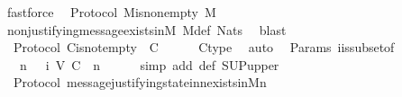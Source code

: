 \begin{isabellebody}
\ fastforce%
\endisatagproof
{\isafoldproof}%
%
\isadelimproof
\isanewline
%
\endisadelimproof
\isanewline
{}\isamarkupfalse%
\ {\isacharparenleft}\ Protocol{\isacharparenright}\ M{\isacharunderscore}is{\isacharunderscore}non{\isacharunderscore}empty{\isacharcolon}\ {\isachardoublequoteopen}M\ {\isasymnoteq}\ {\isasymemptyset}{\isachardoublequoteclose}\isanewline
%
\isadelimproof
\ \ %
\endisadelimproof
%
\isatagproof
{}\isamarkupfalse%
\ non{\isacharunderscore}justifying{\isacharunderscore}message{\isacharunderscore}exists{\isacharunderscore}in{\isacharunderscore}M{\isacharunderscore}{}\ M{\isacharunderscore}def\ Nats{\isacharunderscore}{}\ \isamarkupfalse%
\ blast%
\endisatagproof
{\isafoldproof}%
%
\isadelimproof
\isanewline
%
\endisadelimproof
\isanewline
{}\isamarkupfalse%
\ {\isacharparenleft}\ Protocol{\isacharparenright}\ C{\isacharunderscore}is{\isacharunderscore}not{\isacharunderscore}empty\ {\isacharcolon}\ {\isachardoublequoteopen}C\ {\isasymnoteq}\ {\isasymemptyset}{\isachardoublequoteclose}\isanewline
%
\isadelimproof
\ \ %
\endisadelimproof
%
\isatagproof
{}\isamarkupfalse%
\ C{\isacharunderscore}type\ \isamarkupfalse%
\ auto%
\endisatagproof
{\isafoldproof}%
%
\isadelimproof
\isanewline
%
\endisadelimproof
\isanewline
{}\isamarkupfalse%
\ {\isacharparenleft}\ Params{\isacharparenright}\ {\isasymSigma}i{\isacharunderscore}is{\isacharunderscore}subset{\isacharunderscore}of{\isacharunderscore}{\isasymSigma}\ {\isacharcolon}\isanewline
\ \ {\isachardoublequoteopen}{\isasymforall}\ n\ {\isasymin}\ {\isasymnat}{\isachardot}\ {\isasymSigma}{\isacharunderscore}i\ {\isacharparenleft}V{\isacharcomma}\ C{\isacharcomma}\ {\isasymepsilon}{\isacharparenright}\ n\ {\isasymsubseteq}\ {\isasymSigma}{\isachardoublequoteclose}\isanewline
%
\isadelimproof
\ \ %
\endisadelimproof
%
\isatagproof
{}\isamarkupfalse%
\ {\isacharparenleft}simp\ add{\isacharcolon}\ {\isasymSigma}{\isacharunderscore}def\ SUP{\isacharunderscore}upper{\isacharparenright}%
\endisatagproof
{\isafoldproof}%
%
\isadelimproof
\isanewline
%
\endisadelimproof
\isanewline
{}\isamarkupfalse%
\ {\isacharparenleft}\ Protocol{\isacharparenright}\ message{\isacharunderscore}justifying{\isacharunderscore}state{\isacharunderscore}in{\isacharunderscore}{\isasymSigma}{\isacharunderscore}n{\isacharunderscore}exists{\isacharunderscore}in{\isacharunderscore}M{\isacharunderscore}n\ {\isacharcolon}\isanewline

\end{isabellebody}
